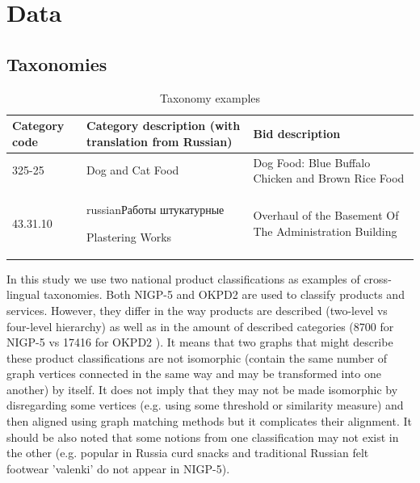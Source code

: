 \documentclass[11pt,a4paper]{article}
\begin{document}
\section{Data}
\subsection{Taxonomies}

\begin{center}
	\begin{table}[!htbp]
		\small
		\caption{Taxonomy examples}
		\label{table-taxonomies}		
		\centering
		\begin{tabular}{|p{1cm}|p{2.5cm}|p{2.5cm}|}
			\hline
			Category code & Category description \newline (with translation from Russian) & Bid description\\
			\hline
			325-25 & Dog and Cat Food & Dog Food: Blue Buffalo Chicken and Brown Rice Food\\
			\hline
			43.31.10 & \begin{otherlanguage*}{russian}Работы штукатурные\end{otherlanguage*} \newline Plastering Works & Overhaul of the Basement Of The Administration Building\\
			\hline
		\end{tabular}
	\end{table}
\end{center}

In this study we use two national product classifications as examples of cross-lingual taxonomies.
Both NIGP-5 and OKPD2 are used to classify products and services. However, they differ in the way products are described (two-level vs four-level hierarchy) as well as in the amount of described categories (8700 for NIGP-5 \cite{wiki-nigp} vs 17416 for OKPD2 \cite{wiki-okpd}). It means that two graphs that might describe these product classifications are not isomorphic (contain the same number of graph vertices connected in the same way and may be transformed into one another) by itself.  It does not imply that they may not be made isomorphic by disregarding some vertices (e.g. using some threshold or similarity measure) and then aligned using graph matching methods but it complicates their alignment. It should be also noted that some notions from one classification may not exist in the other (e.g. popular in Russia curd snacks and traditional Russian felt footwear 'valenki' do not appear in NIGP-5).
\end{document}
